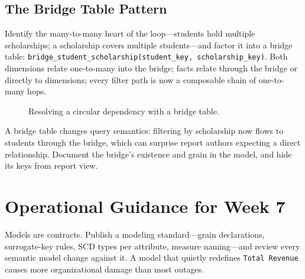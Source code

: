 \subsection{The Bridge Table Pattern}
Identify the many-to-many heart of the loop---students hold multiple scholarships; a scholarship covers multiple students---and factor it into a bridge table: \texttt{bridge\_student\_scholarship(student\_key, scholarship\_key)}. Both dimensions relate one-to-many into the bridge; facts relate through the bridge or directly to dimensions; every filter path is now a composable chain of one-to-many hops.

\begin{figure}[H]
    \centering
    \caption{Resolving a circular dependency with a bridge table.}
    \label{fig:chapter7-bridge}
\end{figure}

\begin{pitfall}
A bridge table changes query semantics: filtering by scholarship now flows to students through the bridge, which can surprise report authors expecting a direct relationship. Document the bridge's existence and grain in the model, and hide its keys from report view.
\end{pitfall}

\section{Operational Guidance for Week 7}
Models are contracts. Publish a modeling standard---grain declarations, surrogate-key rules, SCD types per attribute, measure naming---and review every semantic model change against it. A model that quietly redefines \texttt{Total Revenue} causes more organizational damage than most outages.

